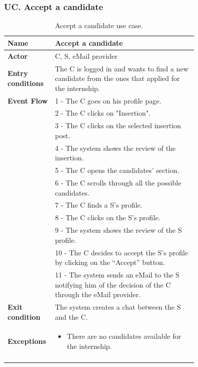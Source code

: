 \newpage

\subsubsection*{UC\cuc . Accept a candidate}
\begin{center}
    \begin{longtable}{|l|p{0.75\linewidth}|}
        \hline
        \textbf{Name}               & Accept a candidate\\
        \hline
        \textbf{Actor}              & C, S, eMail provider\\
        \hline
        \textbf{Entry conditions}   & The C is logged in and wants to find a new candidate from the ones that applied for the internship.\\
        \hline
        \textbf{Event Flow}         & 1 - The C goes on his profile page. \\
        & 2 - The C clicks on "Insertion". \\
        & 3 - The C clicks on the selected insertion post. \\
        & 4 - The system shows the review of the insertion. \\
        & 5 - The C opens the candidates’ section. \\
        & 6 - The C scrolls through all the possible candidates. \\
        & 7 - The C finds a S’s profile. \\
        & 8 - The C clicks on the S’s profile. \\
        & 9 - The system shows the review of the S profile. \\
        & 10 - The C decides to accept the S’s profile by clicking on the “Accept” button. \\
        & 11 - The system sends an eMail to the S notifying him of the decision of the C through the eMail provider. \\
        \hline
        \textbf{Exit condition}   & The system creates a chat between the S and the C. \\       
        \hline
        \textbf{Exceptions}       & \begin{itemize}
            \item There are no candidates available for the internship.
        \end{itemize}\\
        \hline
        \caption{Accept a candidate use case.}
        \label{tab: accept_a_candidate_use_case}
    \end{longtable}
\end{center}


